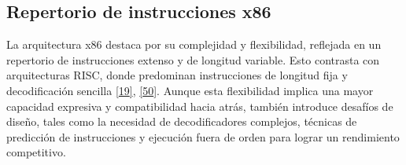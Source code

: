 \documentclass[12pt,oneside]{templates/unerthesis}
\begin{document}
\begin{table}[!h]
\centering
\caption{\label{tab:evolucionx86}Línea de Tiempo de la Evolución de la Arquitectura x86}
\centering
{}
\end{table}

\hypertarget{repertorio-de-instrucciones-x86}{%
\subsection{Repertorio de instrucciones x86}\label{repertorio-de-instrucciones-x86}}

La arquitectura x86 destaca por su complejidad y flexibilidad, reflejada en un repertorio de instrucciones extenso y de longitud variable. Esto contrasta con arquitecturas RISC, donde predominan instrucciones de longitud fija y decodificación sencilla \protect\hyperlink{ref-hennessy2017computer}{{[}19{]}}, \protect\hyperlink{ref-brey_intel_microprocessors}{{[}50{]}}. Aunque esta flexibilidad implica una mayor capacidad expresiva y compatibilidad hacia atrás, también introduce desafíos de diseño, tales como la necesidad de decodificadores complejos, técnicas de predicción de instrucciones y ejecución fuera de orden para lograr un rendimiento competitivo.
\end{document}
